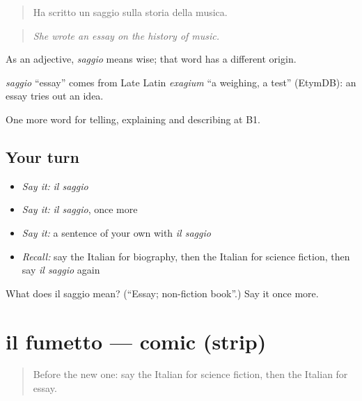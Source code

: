 \begin{quote}
Ha scritto un saggio sulla storia della musica.
\end{quote}

\begin{quote}
\emph{She wrote an essay on the history of music.}
\end{quote}

As an adjective, \emph{saggio} means wise; that word has a different origin.

\begin{cousinweb}
\emph{saggio} \textquotedblleft{}essay\textquotedblright{} comes from Late Latin \emph{exagium} \textquotedblleft{}a weighing, a test\textquotedblright{} (EtymDB): an essay tries out an idea.
\end{cousinweb}

\begin{grammarlens}[title={What you've built}]
One more word for telling, explaining and describing at B1.
\end{grammarlens}

\subsection*{Your turn}
\begin{itemize}
\raggedright
  \item \emph{Say it:} \emph{il saggio}
  \item \emph{Say it:} \emph{il saggio}, once more
  \item \emph{Say it:} a sentence of your own with \emph{il saggio}
  \item \emph{Recall:} say the Italian for biography, then the Italian for science fiction, then say \emph{il saggio} again
\end{itemize}

\begin{tcolorbox}[breakable,colback=teal!4,colframe=teal!35!black,title={Before you move on}]
What does il saggio mean? (\textquotedblleft{}Essay; non-fiction book\textquotedblright{}.) Say it once more.
\end{tcolorbox}
\section[il fumetto]{il fumetto — comic (strip)}

\label{lesson:IT-C527-fumetto}



\begin{quote}
Before the new one: say the Italian for science fiction, then the Italian for essay.
\end{quote}

